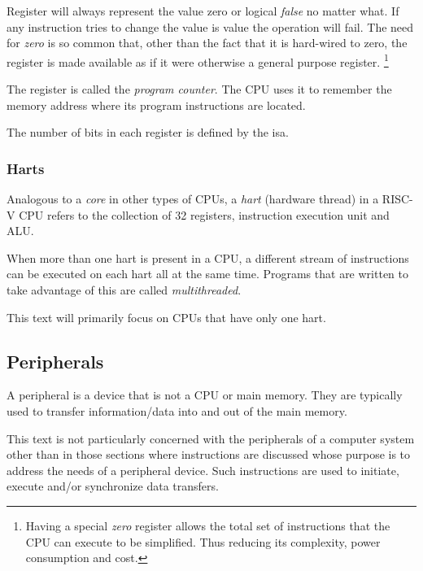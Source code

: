 Register  will always represent the value zero or logical {\em false}  
no matter what.  If any instruction tries to change the value is  value the 
operation will fail.  The need for {\em zero} is so common that, other than the 
fact that it is hard-wired to zero, the  register is made available as 
if it were otherwise a general purpose register.%
\footnote{Having a special 
{\em zero} register allows the total set of instructions that the CPU can execute 
to be simplified.  Thus reducing its complexity, power consumption and cost.} 

The  register is called the {\em program counter}.  The CPU uses it to
remember the memory address where its program instructions are located.

The number of bits in each register is defined by the \acrfull{isa}.

\subsubsection{Harts}

Analogous to a {\em core} in other types of CPUs, a {\em \acrshort{hart}} 
(hardware \gls{thread}) in a RISC-V CPU refers to the collection of 32 registers,
instruction execution unit and ALU.

When more than one hart is present in a CPU, a different stream of instructions can 
be executed on each hart all at the same time.
Programs that are written to take advantage of this are called {\em multithreaded}.

This text will primarily focus on CPUs that have only one hart.

\subsection{Peripherals}

A peripheral is a device that is not a CPU or main memory.  They are 
typically used to transfer information/data into and out of the 
main memory.

This text is not particularly concerned with the peripherals of a computer
system other than in those sections where instructions are discussed 
whose purpose is to address the needs of a peripheral device.  Such
instructions are used to initiate, execute and/or synchronize data transfers.


